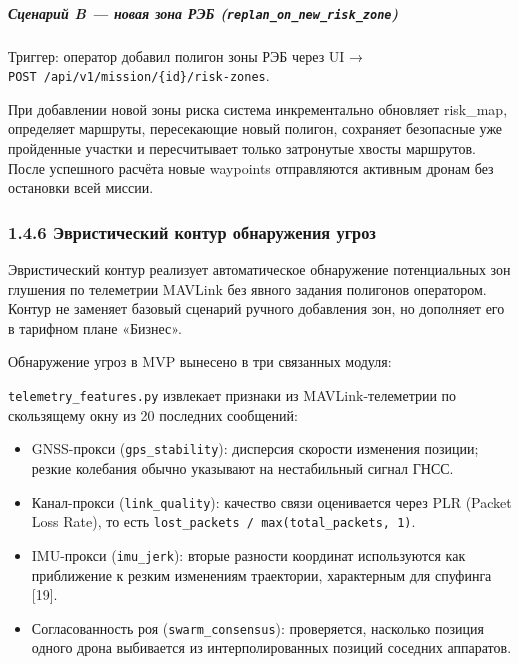 \documentclass[14pt,a4paper]{extarticle}
\providecommand{\tightlist}{%
  \setlength{\itemsep}{0pt}\setlength{\parskip}{0pt}}
\begin{document}
\hypertarget{ux441ux446ux435ux43dux430ux440ux438ux439-b-ux43dux43eux432ux430ux44f-ux437ux43eux43dux430-ux440ux44dux431-replan_on_new_risk_zone}{%
\subparagraph{\texorpdfstring{Сценарий B --- новая зона РЭБ (\texttt{replan\_on\_new\_risk\_zone})}{Сценарий B --- новая зона РЭБ (replan\_on\_new\_risk\_zone)}}\label{ux441ux446ux435ux43dux430ux440ux438ux439-b-ux43dux43eux432ux430ux44f-ux437ux43eux43dux430-ux440ux44dux431-replan_on_new_risk_zone}}

Триггер: оператор добавил полигон зоны РЭБ через UI → \texttt{POST\ /api/v1/mission/\{id\}/risk-zones}.

При добавлении новой зоны риска система инкрементально обновляет risk_map, определяет маршруты, пересекающие новый полигон, сохраняет безопасные уже пройденные участки и пересчитывает только затронутые хвосты маршрутов. После успешного расчёта новые waypoints отправляются активным дронам без остановки всей миссии.


\hypertarget{ux44dux432ux440ux438ux441ux442ux438ux447ux435ux441ux43aux438ux439-ux43aux43eux43dux442ux443ux440-ux43eux431ux43dux430ux440ux443ux436ux435ux43dux438ux44f-ux443ux433ux440ux43eux437}{%
\subsubsection{1.4.6 Эвристический контур обнаружения угроз}\label{ux44dux432ux440ux438ux441ux442ux438ux447ux435ux441ux43aux438ux439-ux43aux43eux43dux442ux443ux440-ux43eux431ux43dux430ux440ux443ux436ux435ux43dux438ux44f-ux443ux433ux440ux43eux437}}

Эвристический контур реализует автоматическое обнаружение потенциальных зон глушения по телеметрии MAVLink без явного задания полигонов оператором. Контур не заменяет базовый сценарий ручного добавления зон, но дополняет его в тарифном плане «Бизнес».

Обнаружение угроз в MVP вынесено в три связанных модуля:

\texttt{telemetry\_features.py} извлекает признаки из MAVLink-телеметрии по скользящему окну из 20 последних сообщений:

\begin{itemize}
\tightlist
\item
  GNSS-прокси (\texttt{gps\_stability}): дисперсия скорости изменения позиции; резкие колебания обычно указывают на нестабильный сигнал ГНСС.
\item
  Канал-прокси (\texttt{link\_quality}): качество связи оценивается через PLR (Packet Loss Rate), то есть \texttt{lost\_packets\ /\ max(total\_packets,\ 1)}.
\item
  IMU-прокси (\texttt{imu\_jerk}): вторые разности координат используются как приближение к резким изменениям траектории, характерным для спуфинга {[}19{]}.
\item
  Согласованность роя (\texttt{swarm\_consensus}): проверяется, насколько позиция одного дрона выбивается из интерполированных позиций соседних аппаратов.
\end{itemize}
\end{document}
